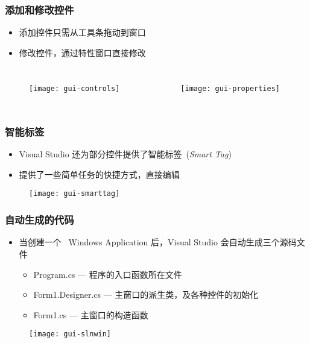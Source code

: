 \begin{frame}
\frametitle{添加和修改控件}
\begin{itemize}
\item 添加控件只需从工具条拖动到窗口
\item 修改控件，通过特性窗口直接修改
\end{itemize}
\begin{columns}
  \begin{figure}[htbp]
    \centering
    \texttt{[image: gui-controls]}
  \end{figure}
  \begin{figure}[htbp]
    \centering
    \texttt{[image: gui-properties]}
  \end{figure}
\end{columns}
\end{frame}

\begin{frame}
\frametitle{智能标签}
\begin{itemize}
\item Visual Studio 还为部分控件提供了智能标签~(\textit{Smart Tag})
\item 提供了一些简单任务的快捷方式，直接编辑
\end{itemize}
\begin{figure}[htbp]
  \centering
  \texttt{[image: gui-smarttag]}
\end{figure}
\end{frame}

\begin{frame}
\frametitle{自动生成的代码}
\begin{itemize}
\item 当创建一个 ~Windows Application 后，Visual Studio 会自动生成三个源码文件
\begin{itemize}
\item Program.cs --- 程序的入口函数所在文件
\item Form1.Designer.cs --- 主窗口的派生类，及各种控件的初始化
\item Form1.cs --- 主窗口的构造函数
\end{itemize}
\end{itemize}
\begin{figure}[htbp]
  \centering
  \texttt{[image: gui-slnwin]}
\end{figure}
\end{frame}

